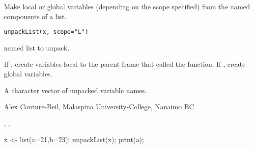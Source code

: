 \documentclass[letterpaper]{book}
\begin{document}
\begin{Description}\relax
Make local or global variables (depending on the scope specified) from 
the named components of a list.
\end{Description}
\begin{Usage}
\begin{verbatim}
unpackList(x, scope="L")
\end{verbatim}
\end{Usage}
\begin{Arguments}
\begin{ldescription}
\item[\code{x}] named list to unpack.
\item[\code{scope}] If , create variables local to the parent frame 
that called the function. If , create global variables.
\end{ldescription}
\end{Arguments}
\begin{Value}
A character vector of unpacked variable names.
\end{Value}
\begin{Author}\relax
Alex Couture-Beil, Malaspina University-College, Nanaimo BC
\end{Author}
\begin{SeeAlso}\relax
{}, , 
\end{SeeAlso}
\begin{Examples}
\begin{ExampleCode}
x <- list(a=21,b=23);
unpackList(x);
print(a);
\end{ExampleCode}
\end{Examples}
\end{document}
